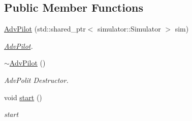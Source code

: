 \subsection*{Public Member Functions}
\begin{DoxyCompactItemize}
\item 
\hyperlink{classAdvPilot_aadb751697a17bad8e80ac26c1a05601b}{Adv\+Pilot} (std\+::shared\+\_\+ptr$<$ simulator\+::\+Simulator $>$ sim)
\begin{DoxyCompactList}\small\item\em \hyperlink{classAdvPilot}{Adv\+Pilot}. \end{DoxyCompactList}\item 
\mbox{\label{classAdvPilot_a7356cb2e0d2388ed5958dbfb5fa073d6}} 
\hyperlink{classAdvPilot_a7356cb2e0d2388ed5958dbfb5fa073d6}{$\sim$\+Adv\+Pilot} ()
\begin{DoxyCompactList}\small\item\em Adv\+Polit Destructor. \end{DoxyCompactList}\item 
void \hyperlink{classAdvPilot_a8a6c363126dc017d6b3e2ca8cc761117}{start} ()
\begin{DoxyCompactList}\small\item\em start \end{DoxyCompactList}\end{DoxyCompactItemize}
